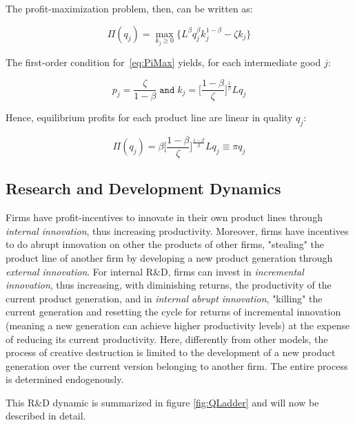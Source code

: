 \documentclass[letterpaper,12pt]{article}
\theoremstyle{definition}
\begin{document}
The profit-maximization problem, then, can be written as:

\begin{equation} \label{eq:PiMax}
\Pi(q_j) = \max\limits_{k_j \geq 0}\Big\{L^{\beta}q_j^{\beta}k_j^{1-\beta} - \zeta k_j\Big\}
\end{equation}

The first-order condition for~\ref{eq:PiMax} yields, for each intermediate good $j$:

\begin{equation} \label{eq:FOC}
p_j = \frac{\zeta}{1-\beta}\; \texttt{and}\;k_j = \Big[\frac{1-\beta}{\zeta}\Big]^{\frac{1}{\beta}}Lq_j
\end{equation}

Hence, equilibrium profits for each product line are linear in quality $q_j$:

\begin{equation} \label{eq:EqProfit}
\Pi(q_j) = \beta\Big[\frac{1-\beta}{\zeta}\Big]^{\frac{1-\beta}{\beta}}Lq_j \equiv \pi q_j
\end{equation}

\subsection{Research and Development Dynamics}

Firms have profit-incentives to innovate in their own product lines through \textit{internal innovation}, thus increasing productivity. Moreover, firms have incentives to do abrupt innovation on other the products of other firms, "stealing" the product line of another firm by developing a new product generation through \textit{external innovation}. For internal R\&D, firms can invest in \textit{incremental innovation}, thus increasing, with diminishing returns, the productivity of the current product generation, and in \textit{internal abrupt innovation}, "killing" the current generation and resetting the cycle for returns of incremental innovation (meaning a new generation can achieve higher productivity levels) at the expense of reducing its current productivity. Here, differently from other models, the process of creative destruction is limited to the development of a new product generation over the current version belonging to another firm. The entire process is determined endogenously. 

This R\&D dynamic is summarized in figure \ref{fig:QLadder} and will now be described in detail.\\
\end{document}
